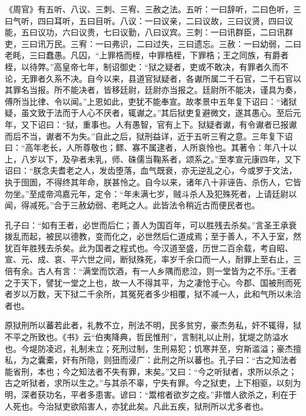 \documentclass[12pt,UTF8]{ctexbook}
\begin{document}
《周官》有五听、八议、三刺、三宥、三赦之法。五听：一曰辞听，二曰色听，三曰气听，四曰耳听，五曰目听。八议：一曰议亲，二曰议故，三曰议贤，四曰议能，五曰议功，六曰议贵，七曰议勤，八曰议宾。三刺：一曰讯群臣，二曰讯群吏，三曰讯万民。三宥：一曰弗识，二曰过失，三曰遗忘。三赦：一曰幼弱，二曰老眊，三曰蠢愚。凡囚，“上罪梏而桎，中罪梏桎，下罪梏；王之同族，有爵者桎，以待弊。”高皇帝七年，制诏御史：“狱之疑者，吏或不敢决，有罪者久而不论，无罪者久系不决。自今以来，县道官狱疑者，各谳所属二千石官，二千石官以其罪名当报。所不能决者，皆移廷尉，廷尉亦当报之。廷尉所不能决，谨具为奏，傅所当比律、令以闻。”上恩如此，吏犹不能奉宣。故孝景中五年复下诏曰：“诸狱疑，虽文致于法而于人心不厌者，辄谳之。”其后狱吏复避微文，遂其愚心。至后元年，又下诏曰：“狱，重事也。人有愚智，官有上下。狱疑者谳，有令谳者已报谳而后不当，谳者不为失。”自此之后，狱刑益详，近于五听三宥之意。三年复下诏曰：“高年老长，人所尊敬也；鳏、寡不属逮者，人所哀怜也。其著令：年八十以上，八岁以下，及孕者未乳，师、硃儒当鞠系者，颂系之。”至孝宣元康四年，又下诏曰：“朕念夫耆老之人，发齿堕落，血气既衰，亦无逆乱之心，今或罗于文法，执于囹圄，不得终其年命，朕甚怜之。自今以来，诸年八十非诬告、杀伤人，它皆勿坐。”至成帝鸿嘉元年，定令：“年未满七岁，贼斗杀人及犯殊死者，上请廷尉以闻，得减死。”合于三赦幼弱、老眊之人。此皆法令稍近古而便民者也。



孔子曰：“如有王者，必世而后仁；善人为国百年，可以胜残去杀矣。”言圣王承衰拨乱而起，被民以德教，变而化之，必世然后仁道成焉；至于善人，不入于室，然犹百年胜残去杀矣。此为国者之程式也。今汉道至盛，历世二百余载，考自昭、宣、元、成、哀、平六世之间，断狱殊死，率岁千余口而一人，耐罪上至右止，三倍有余。古人有言：“满堂而饮酒，有一人乡隅而悲泣，则一堂皆为之不乐。”王者之于天下，譬犹一堂之上也，故一人不得其平，为之凄怆于心。今郡、国被刑而死者岁以万数，天下狱二千余所，其冤死者多少相覆，狱不减一人，此和气所以未洽者也。



原狱刑所以蕃若此者，礼教不立，刑法不明，民多贫穷，豪杰务私，奸不辄得，狱不平之所致也。《书》云“伯夷降典，哲民惟刑”，言制礼以止刑，犹堤之防溢水也。今堤防凌迟，礼制未立；死刑过制，生刑易犯；饥寒并至，穷斯滥溢；豪杰擅私，为之囊橐，奸有所隐，则狃而浸广：此刑之所以蕃也。孔子曰：“古之知法者能省刑，本也；今之知法者不失有罪，末矣。”又曰：“今之听狱者，求所以杀之；古之听狱者，求所以生之。”与其杀不辜，宁失有罪。今之狱吏，上下相驱，以刻为明，深者获功名，平者多患害。谚曰：“鬻棺者欲岁之疫。”非憎人欲杀之，利在于人死也。今治狱吏欲陷害人，亦犹此矣。凡此五疾，狱刑所以尤多者也。
\end{document}
